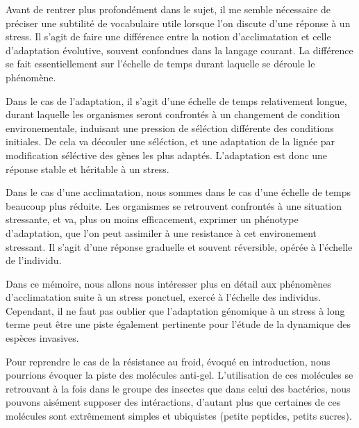 Avant de rentrer plus profondément dans le sujet, il me semble nécessaire de
préciser une subtilité de vocabulaire utile lorsque l'on discute d'une réponse
à un stress. Il s'agit de faire une différence entre la notion d'acclimatation
et celle d'adaptation évolutive, souvent confondues dans la langage courant.
La différence se fait essentiellement sur l'échelle de temps durant laquelle
se déroule le phénomène.

Dans le cas de l'adaptation, il s'agit d'une échelle de temps relativement
longue, durant laquelle les organismes seront confrontés à un changement de
condition environementale, induisant une pression de séléction différente des
conditions initiales. De cela va découler une séléction, et une adaptation de
la lignée par modification séléctive des gènes les plus adaptés. L'adaptation
est donc une réponse stable et héritable à un stress.

Dans le cas d'une acclimatation, nous sommes dans le cas d'une échelle de
temps beaucoup plus réduite. Les organismes se retrouvent confrontés à une
situation stressante, et va, plus ou moins efficacement, exprimer un phénotype
d'adaptation, que l'on peut assimiler à une resistance à cet environement
stressant. Il s'agit d'une réponse graduelle et souvent réversible, opérée à
l'échelle de l'individu.



Dans ce mémoire, nous allons nous intéresser plus en détail aux phénomènes
d'acclimatation suite à un stress ponctuel, exercé à l'échelle des individus.
Cependant, il ne faut pas oublier que l'adaptation génomique à un stress à
long terme peut être une piste également pertinente pour l'étude de la
dynamique des espèces invasives.

Pour reprendre le cas de la résistance au froid, évoqué en introduction, nous
pourrions évoquer la piste des molécules anti-gel. L'utilisation de ces
molécules se retrouvant à la fois dans le groupe des insectes\cite{duman2001}
que dans celui des bactéries\cite{xu1998}, nous pouvons aisément supposer des
intéractions, d'autant plus que certaines de ces molécules sont extrêmement
simples et ubiquistes (petite peptides, petits sucres).
